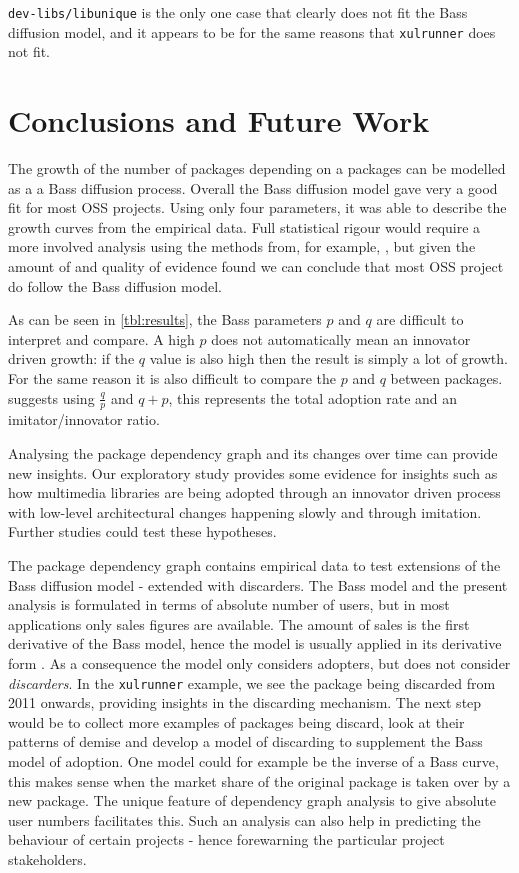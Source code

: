 \documentclass[smallextended,final]{svjour3}
\begin{document}
\texttt{dev-libs/libunique} is the only one case that clearly does not fit the Bass diffusion model, and it appears to be for the same reasons that \texttt{xulrunner} does not fit.




\section{Conclusions and Future Work}

The growth of the number of packages depending on a packages can be modelled as a a Bass diffusion process. Overall the Bass diffusion model gave very a good fit for most OSS projects. Using only four parameters, it was able to describe the growth curves from the empirical data. Full statistical rigour would require a more involved analysis using the methods from, for example, \citet{carlos06}, but given the amount of and quality of evidence found we can conclude that most OSS project do follow the Bass diffusion model.

As can be seen in \ref{tbl:results}, the Bass parameters $p$ and $q$ are difficult to interpret and compare. A high $p$ does not automatically mean an innovator driven growth: if the $q$ value is also high then the result is simply a lot of growth. For the same reason it is also difficult to compare the $p$ and $q$ between packages. \citet{mahajan95} suggests using $\frac{q}{p}$ and $q + p$, this represents the total adoption rate and an imitator/innovator ratio.

Analysing the package dependency graph and its changes over time can provide new insights. Our exploratory study provides some evidence for insights such as how multimedia libraries are being adopted through an innovator driven process with low-level architectural changes happening slowly and through imitation. Further studies could test these hypotheses.

The package dependency graph contains empirical data to test extensions of the Bass diffusion model - extended with discarders. The Bass model and the present analysis is formulated in terms of absolute number of users, but in most applications only sales figures are available. The amount of sales is the first derivative of the Bass model, hence the model is usually applied in its derivative form \citep{mahajan95}. As a consequence the model only considers adopters, but does not consider \emph{discarders}. In the \verb|xulrunner| example, we see the package being discarded from 2011 onwards, providing insights in the discarding mechanism. The next step would be to collect more examples of packages being discard, look at their patterns of demise and develop a model of discarding to supplement the Bass model of adoption. One model could for example be the inverse of a Bass curve, this makes sense when the market share of the original package is taken over by a new package. The unique feature of dependency graph analysis to give absolute user numbers facilitates this. Such an analysis can also help in predicting the behaviour of certain projects - hence forewarning the particular project stakeholders.
\end{document}
